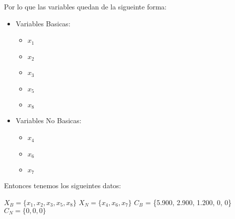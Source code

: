 \documentclass[10pt,a4paper]{article}
\begin{document}
\begin{enumerate}
\begin{itemize}
    \end{itemize}

    Por lo que las variables quedan de la sigueinte forma:

    \begin{itemize}

        \item Variables Basicas:
        \begin{itemize}

            \item $x_{1}$
            \item $x_{2}$
            \item $x_{3}$
            \item $x_{5}$
            \item $x_{8}$\\
    
        \end{itemize}
        \item Variables No Basicas:
        \begin{itemize}

            \item $x_{4}$
            \item $x_{6}$
            \item $x_{7}$
    
        \end{itemize}

    \end{itemize}

    Entonces tenemos los sigueintes datos:\\

    \begin{center}
    $X_{B} = \{x_{1}, x_{2}, x_{3}, x_{5}, x_{8}\}$ \hspace{1em} $X_{N} = \{x_{4}, x_{6}, x_{7}\}$ 
    \hspace{1em} $C_{B}$ = \{5.900, 2.900, 1.200, 0, 0\} \hspace{1em} $C_{N} = \{0, 0, 0\}$\\
    \end{center}


\end{enumerate}
\end{document}
